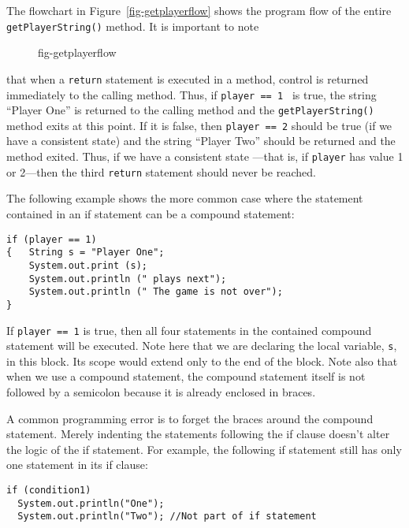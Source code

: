 \noindent The flowchart in Figure~\ref{fig-getplayerflow} shows the program flow
of the entire {\tt getPlayerString()} method.  It is important to note
\begin{figure}[htb]
{fig-getplayerflow}
\end{figure}
that when a {\tt return} statement is executed
in a method, control is returned immediately to the calling method.
Thus, if {\tt player == 1 } is true, the string ``Player One'' is
returned to the calling method and the {\tt getPlayerString()} method
exits at this point.  If it is false, then {\tt player == 2} should be
true (if we have a consistent state) and the string ``Player Two''
should be returned and the method exited.  Thus, if we have a
consistent state ---that is, if {\tt player} has value 1 or 2---then
the third {\tt return} statement should never be reached.

The following example shows the more common case where the statement
contained in an if statement can be a compound statement:

\begin{jjjlisting}
\begin{lstlisting}
if (player == 1)
{   String s = "Player One";
    System.out.print (s);
    System.out.println (" plays next");
    System.out.println (" The game is not over");
}
\end{lstlisting}
\end{jjjlisting}

\noindent If {\tt player == 1} is true, then all four statements
in the contained compound statement will be executed.  Note here that
we are declaring the local variable, {\tt s}, in this block.  Its
scope would extend only to the end of the block.  Note also that when
we use a compound statement, the compound statement itself is not
followed by a semicolon because it is already enclosed in braces.

A common programming error is to forget the braces around the compound
statement.  Merely indenting the statements following the if clause
doesn't alter the logic of the if statement.   For example, the
following if statement still has only one statement in its if clause:

\begin{jjjlisting}
\begin{lstlisting}
if (condition1)
  System.out.println("One");
  System.out.println("Two"); //Not part of if statement
\end{lstlisting}
\end{jjjlisting}

